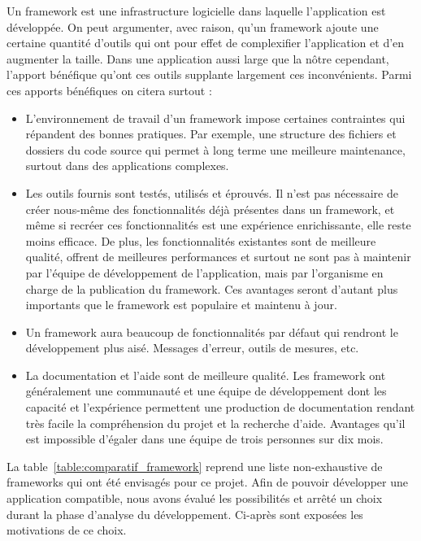 \documentclass{EPL-master-thesis-covers-FR}
\begin{document}
				Un framework est une infrastructure logicielle dans laquelle l'application est développée. On peut argumenter, avec raison, qu'un framework ajoute une certaine quantité d'outils qui ont pour effet de complexifier l'application et d'en augmenter la taille. Dans une application aussi large que la nôtre cependant, l'apport bénéfique qu'ont ces outils supplante largement ces inconvénients. Parmi ces apports bénéfiques on citera surtout :
				\begin{itemize}
					\item L'environnement de travail d'un framework impose certaines contraintes qui répandent des bonnes pratiques. Par exemple, une structure des fichiers et dossiers du code source qui permet à long terme une meilleure maintenance, surtout dans des applications complexes.
					\item Les outils fournis sont testés, utilisés et éprouvés. Il n'est pas nécessaire de créer nous-même des fonctionnalités déjà présentes dans un framework, et même si recréer ces fonctionnalités est une expérience enrichissante, elle reste moins efficace. De plus, les fonctionnalités existantes sont de meilleure qualité, offrent de meilleures performances et surtout ne sont pas à maintenir par l'équipe de développement de l'application, mais par l'organisme en charge de la publication du framework. Ces avantages seront d'autant plus importants que le framework est populaire et maintenu à jour.
					\item Un framework aura beaucoup de fonctionnalités par défaut qui rendront le développement plus aisé. Messages d'erreur, outils de mesures, etc.
					\item La documentation et l'aide sont de meilleure qualité. Les framework ont généralement une communauté et une équipe de développement dont les capacité et l'expérience permettent une production de documentation rendant très facile la compréhension du projet et la recherche d'aide. Avantages qu'il est impossible d'égaler dans une équipe de trois personnes sur dix mois.
				\end{itemize}

				La table~\ref{table:comparatif_framework} reprend une liste non-exhaustive de frameworks qui ont été envisagés pour ce projet. Afin de pouvoir développer une application compatible, nous avons évalué les possibilités et arrêté un choix durant la phase d'analyse du développement. Ci-après sont exposées les motivations de ce choix.
\end{document}
